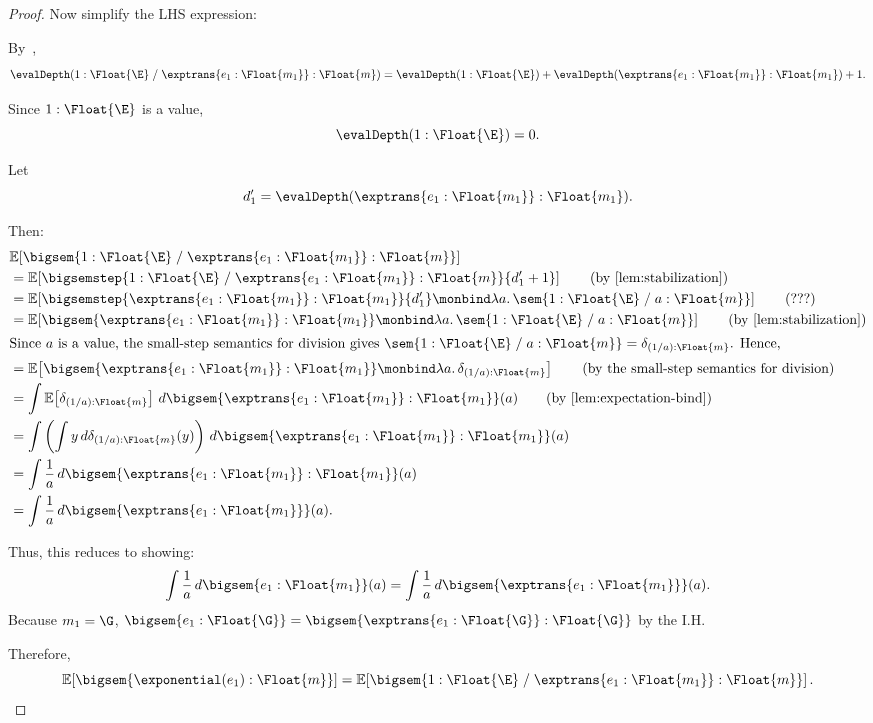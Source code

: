 \begin{proof}
  Now simplify the LHS expression:

  By~,
  \[
    \evalDepth(1 : \Float{\E} \;/\; \exptrans{e_1 : \Float{m_1}} : \Float{m})
    =
    \evalDepth(1 : \Float{\E}) + \evalDepth(\exptrans{e_1 : \Float{m_1}} : \Float{m_1}) + 1.
  \]

  Since $1 : \Float{\E}$ is a value,
  \[
    \evalDepth(1 : \Float{\E}) = 0.
  \]

  Let
  \[
    d_1' = \evalDepth(\exptrans{e_1 : \Float{m_1}} : \Float{m_1}).
  \]

  Then:
  \begin{align*}
    &\mathbb{E}\!\left[
      \bigsem{
        1 : \Float{\E} \;/\; \exptrans{e_1 : \Float{m_1}}
        : \Float{m}
      }
    \right]\\
    &=
    \mathbb{E}\!\left[
      \bigsemstep{
        1 : \Float{\E} \;/\; \exptrans{e_1 : \Float{m_1}}
        : \Float{m}
      }{d_1'+1}
    \right] \tag{by~\Cref{lem:stabilization}}\\
    &=
    \mathbb{E}\!\left[
    \bigsemstep{\exptrans{e_1 : \Float{m_1}} : \Float{m_1}}{d_1'}
    \monbind
    \lambda a.\,
      \sem{1 : \Float{\E} \;/\; a : \Float{m}} \right] \tag{???}\\
    &=
    \mathbb{E}\!\left[
    \bigsem{\exptrans{e_1 : \Float{m_1}} : \Float{m_1}}
    \monbind
    \lambda a.\,
      \sem{1 : \Float{\E} \;/\; a : \Float{m}}\right] \tag{by~\Cref{lem:stabilization}}\\
  \intertext{Since $a$ is a value, the small-step semantics for division gives
  $\sem{1 : \Float{\E} \;/\; a : \Float{m}}
  =
  \delta_{(1/a) : \Float{m}}$. Hence,}
    &=
    \mathbb{E}\!\left[
    \bigsem{\exptrans{e_1 : \Float{m_1}} : \Float{m_1}}
    \monbind
    \lambda a.\,
      \delta_{(1/a) : \Float{m}}\right] \tag{by the small-step semantics for division}\\
    &=
    \int
      \mathbb{E}\!\left[
        \delta_{(1/a) : \Float{m}}
      \right]
    \,d\bigsem{\exptrans{e_1 : \Float{m_1}} : \Float{m_1}}(a) \tag{by~\Cref{lem:expectation-bind}}\\
    &=
    \int
      \left(
      \int
        y
      \,d\delta_{(1/a) : \Float{m}}(y)
      \right)
    \,d\bigsem{\exptrans{e_1 : \Float{m_1}} : \Float{m_1}}(a) \\
    &=
    \int
      \frac{1}{a}
    \,d\bigsem{\exptrans{e_1 : \Float{m_1}} : \Float{m_1}}(a) \\
    &=
    \int
      \frac{1}{a}
    \,d\bigsem{\exptrans{e_1 : \Float{m_1}}}(a).
  \end{align*}

  Thus, this reduces to showing:
  \[
    \int
      \frac{1}{a}
    \,d\bigsem{e_1 : \Float{m_1}}(a)
    =
    \int
      \frac{1}{a}
    \,d\bigsem{\exptrans{e_1 : \Float{m_1}}}(a).
  \]
  Because $m_1 = \G$, $\bigsem{e_1 : \Float{\G}} = \bigsem{\exptrans{e_1 : \Float{\G}} : \Float{\G}}$ by the I.H.

  Therefore,
  \[
    \mathbb{E}[\bigsem{\exponential(e_1) : \Float{m}}]
    =
    \mathbb{E}\!\left[
      \bigsem{
        1 : \Float{\E} \;/\; \exptrans{e_1 : \Float{m_1}}
        : \Float{m}
      }
    \right].
  \]
\end{proof}


